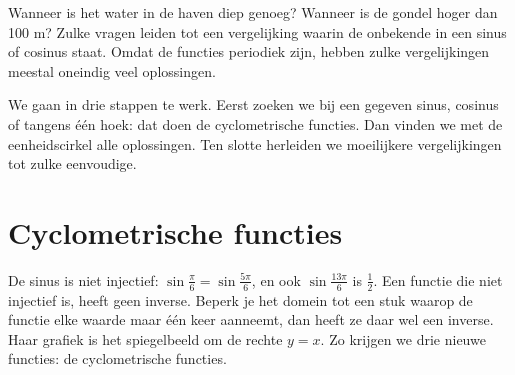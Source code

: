 %



Wanneer is het water in de haven diep genoeg? Wanneer is de gondel hoger dan 100 m? Zulke vragen leiden tot een vergelijking waarin de onbekende in een sinus of cosinus staat. Omdat de functies periodiek zijn, hebben zulke vergelijkingen meestal oneindig veel oplossingen.

We gaan in drie stappen te werk. Eerst zoeken we bij een gegeven sinus, cosinus of tangens één hoek: dat doen de cyclometrische functies. Dan vinden we met de eenheidscirkel alle oplossingen. Ten slotte herleiden we moeilijkere vergelijkingen tot zulke eenvoudige.

\begin{oefeningen}[Start]

\end{oefeningen}

\section{Cyclometrische functies}

De sinus is niet injectief: $\sin\frac{\pi}{6} = \sin\frac{5\pi}{6}$, en ook $\sin\frac{13\pi}{6}$ is $\frac12$. Een functie die niet injectief is, heeft geen inverse. Beperk je het domein tot een stuk waarop de functie elke waarde maar één keer aanneemt, dan heeft ze daar wel een inverse. Haar grafiek is het spiegelbeeld om de rechte $y = x$. Zo krijgen we drie nieuwe functies: de cyclometrische functies.

